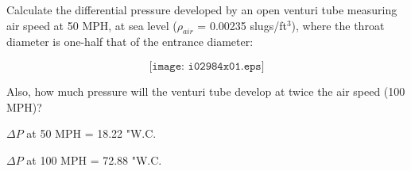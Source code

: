 

Calculate the differential pressure developed by an open venturi tube measuring air speed at 50 MPH, at sea level ($\rho_{air}$ = 0.00235 slugs/ft$^{3}$), where the throat diameter is one-half that of the entrance diameter:

$$\texttt{[image: i02984x01.eps]}$$

Also, how much pressure will the venturi tube develop at twice the air speed (100 MPH)?







$\Delta P$ at 50 MPH = 18.22 "W.C.

\vskip 10pt

$\Delta P$ at 100 MPH = 72.88 "W.C.










